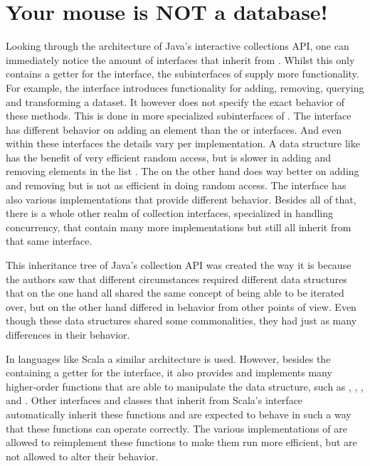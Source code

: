 \section{Your mouse is NOT a database!}
Looking through the architecture of Java's interactive collections API, one can immediately notice the amount of interfaces that inherit from \itb \cite{java-iterable-api}. Whilst this \itb only contains a getter for the \itr interface, the subinterfaces of \itb supply more functionality. For example, the  interface introduces functionality for adding, removing, querying and transforming a dataset. It however does not specify the exact behavior of these methods. This is done in more specialized subinterfaces of . The  interface has different behavior on adding an element than the  or  interfaces. And even within these interfaces the details vary per implementation. A data structure like  has the benefit of very efficient random access, but is slower in adding and removing elements in the list \cite{linkedlist-vs-arraylist}. The  on the other hand does way better on adding and removing but is not as efficient in doing random access. The  interface has also various implementations that provide different behavior. Besides all of that, there is a whole other realm of collection interfaces, specialized in handling concurrency, that contain many more implementations but still all inherit from that same \itb interface.

This inheritance tree of Java's collection API was created the way it is because the authors saw that different circumstances required different data structures that on the one hand all shared the same concept of being able to be iterated over, but on the other hand differed in behavior from other points of view. Even though these data structures shared some commonalities, they had just as many differences in their behavior.

In languages like Scala a similar architecture is used. However, besides the \itb containing a getter for the \itr interface, it also provides and implements many higher-order functions that are able to manipulate the data structure, such as , , ,  and . Other interfaces and classes that inherit from Scala's \itb interface automatically inherit these functions and are expected to behave in such a way that these functions can operate correctly. The various implementations of \itb are allowed to reimplement these functions to make them run more efficient, but are not allowed to alter their behavior.

